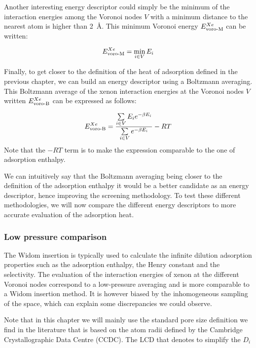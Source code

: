 \documentclass[main]{subfiles}
\begin{document}
Another interesting energy descriptor could simply be the minimum of the interaction energies among the Voronoi nodes $V$ with a minimum distance to the nearest atom is higher than \SI{2}{\angstrom}. This minimum Voronoi energy $E_{\text{voro-M}}^{Xe}$ can be written: 

\begin{equation}
    E_{\text{voro-M}}^{Xe} = \min_{i \in V} E_i
\end{equation}

Finally, to get closer to the definition of the heat of adsorption defined in the previous chapter, we can build an energy descriptor using a Boltzmann averaging. This Boltzmann average of the xenon interaction energies at the Voronoi nodes $V$ written $E_{\text{voro-B}}^{Xe}$ can be expressed as follows:

\begin{equation}
    E_{\text{voro-B}}^{Xe} = \dfrac{\sum\limits_{i \in V} E_i e^{-\beta E_i}}{\sum\limits_{i \in V} e^{-\beta E_i}} -RT
\end{equation}
Note that the $-RT$ term is to make the expression comparable to the one of adsorption enthalpy. 

We can intuitively say that the Boltzmann averaging being closer to the definition of the adsorption enthalpy it would be a better candidate as an energy descriptor, hence improving the screening methodology. To test these different methodologies, we will now compare the different energy descriptors to more accurate evaluation of the adsorption heat. 

\subsubsection{Low pressure comparison}

The Widom insertion is typically used to calculate the infinite dilution adsorption properties such as the adsorption enthalpy, the Henry constant and the selectivity. The evaluation of the interaction energies of xenon at the different Voronoi nodes correspond to a low-pressure averaging and is more comparable to a Widom insertion method. It is however biased by the inhomogeneous sampling of the space, which can explain some discrepancies we could observe.

Note that in this chapter we will mainly use the standard pore size definition we find in the literature that is based on the atom radii defined by the Cambridge Crystallographic Data Centre (CCDC). The LCD that denotes to simplify the $D_i$  
\end{document}
